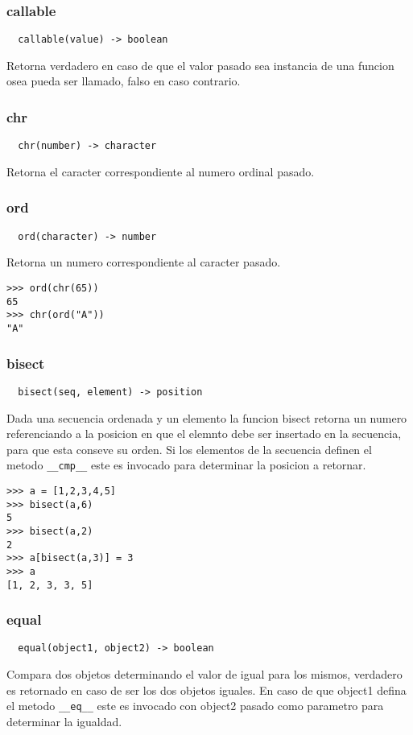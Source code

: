 \subsubsection*{callable}
\begin{verbatim}
  callable(value) -> boolean
\end{verbatim}
Retorna verdadero en caso de que el valor pasado sea instancia de una funcion
osea pueda ser llamado, falso en caso contrario.

\subsubsection*{chr}
\begin{verbatim}
  chr(number) -> character
\end{verbatim}
Retorna el caracter correspondiente al numero ordinal pasado.

\subsubsection*{ord}
\begin{verbatim}
  ord(character) -> number
\end{verbatim}
Retorna un numero correspondiente al caracter pasado.
\begin{lstlisting}[style=consola]
>>> ord(chr(65))
65
>>> chr(ord("A"))
"A"
\end{lstlisting}

\subsubsection*{bisect}
\begin{verbatim}
  bisect(seq, element) -> position
\end{verbatim}
Dada una secuencia ordenada y un elemento la funcion bisect retorna un numero
referenciando a la posicion en que el elemnto debe ser insertado en la
secuencia, para que esta conseve su orden.
Si los elementos de la secuencia definen el metodo \verb|__cmp__| este es
invocado para determinar la posicion a retornar.
\begin{lstlisting}[style=consola]
>>> a = [1,2,3,4,5]
>>> bisect(a,6)
5
>>> bisect(a,2)
2
>>> a[bisect(a,3)] = 3
>>> a
[1, 2, 3, 3, 5]
\end{lstlisting}

\subsubsection*{equal}
\begin{verbatim}
  equal(object1, object2) -> boolean
\end{verbatim}
Compara dos objetos determinando el valor de igual para los mismos, verdadero es
retornado en caso de ser los dos objetos iguales.
En caso de que object1 defina el metodo \verb|__eq__| este es invocado con
object2 pasado como parametro para determinar la igualdad.


